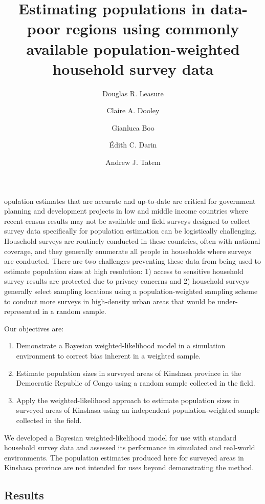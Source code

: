 \documentclass[9pt,twocolumn,twoside,lineno]{pnas-new}
\title{Estimating populations in data-poor regions using commonly available population-weighted household survey data}
\author[a,1]{Douglas R. Leasure}
\author[a]{Claire A. Dooley}
\author[a]{Gianluca Boo}
\author[a]{Édith C. Darin}
\author[a]{Andrew J. Tatem}
\affil[a]{WorldPop, Geography and Environmental Science, University of Southampton, Highfield, Southampton SO17 1BJ, UK.}
\begin{document}
\maketitle
\thispagestyle{firststyle}


opulation estimates that are accurate and up-to-date are critical for government planning and development projects in low and middle income countries where recent census results may not be available and field surveys designed to collect survey data specifically for population estimation can be logistically challenging.  Household surveys are routinely conducted in these countries, often with national coverage, and they generally enumerate all people in households where surveys are conducted.  There are two challenges preventing these data from being used to estimate population sizes at high resolution: 1) access to sensitive household survey results are protected due to privacy concerns and 2) household surveys generally select sampling locations using a population-weighted sampling scheme to conduct more surveys in high-density urban areas that would be under-represented in a random sample. 

Our objectives are:

\begin{enumerate}
	\item Demonstrate a Bayesian weighted-likelihood model in a simulation environment to correct bias inherent in a weighted sample.
	\item Estimate population sizes in surveyed areas of Kinshasa province in the Democratic Republic of Congo using a random sample collected in the field.
	\item Apply the weighted-likelihood approach to estimate population sizes in surveyed areas of Kinshasa using an independent population-weighted sample collected in the field.
\end{enumerate}

We developed a Bayesian weighted-likelihood model for use with standard household survey data and assessed its performance in simulated and real-world environments.  The population estimates produced here for surveyed areas in Kinshasa province are not intended for uses beyond demonstrating the method.

\subsection*{Results}
\end{document}
